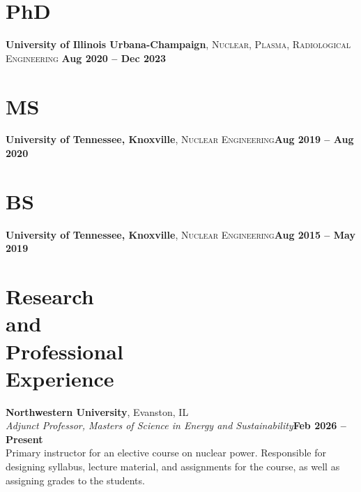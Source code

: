 \documentclass[margin,line]{resume}
\begin{document}
\begin{resume}
    \section{\mysidestyle PhD}
    \textbf{University of Illinois Urbana-Champaign}, \textsc{Nuclear, Plasma, Radiological Engineering}\hfill \textbf{ Aug 2020 -- Dec 2023}\vspace{-3mm}%

    \section{\mysidestyle MS}
    \textbf{University of Tennessee, Knoxville}, \textsc{Nuclear Engineering}\hfill\textbf{Aug 2019 -- Aug 2020}\vspace{-3mm}
    
    \section{\mysidestyle BS}
    \textbf{University of Tennessee, Knoxville}, \textsc{Nuclear Engineering}\hfill\textbf{Aug 2015 -- May 2019}\vspace{-3mm}
    \section{\mysidestyle Research\\and\\Professional\\Experience}
    \textbf{Northwestern University}, Evanston, IL \vspace{1mm}\\
                \textsl{Adjunct Professor, Masters of Science in Energy and Sustainability}\hfill \textbf{Feb 2026 -- Present}\\
                Primary instructor for an elective course on nuclear power. Responsible for designing 
                syllabus, lecture material, and assignments for the course, as well as assigning grades to 
                the students. 


\end{resume}
\end{document}

